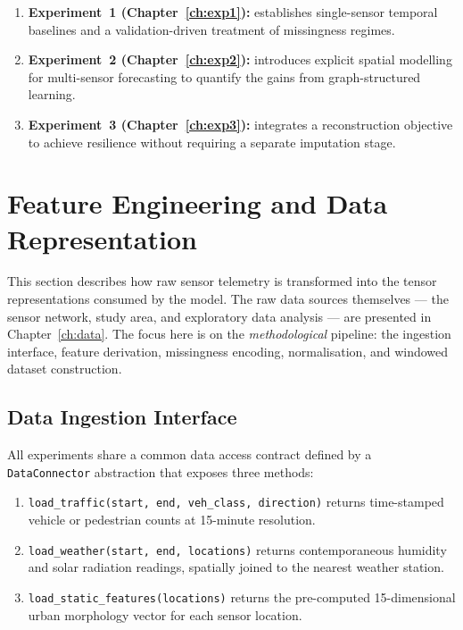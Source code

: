 \begin{enumerate}
    \item \textbf{Experiment~1 (Chapter~\ref{ch:exp1}):} establishes single-sensor temporal baselines and a validation-driven treatment of missingness regimes.
    \item \textbf{Experiment~2 (Chapter~\ref{ch:exp2}):} introduces explicit spatial modelling for multi-sensor forecasting to quantify the gains from graph-structured learning.
    \item \textbf{Experiment~3 (Chapter~\ref{ch:exp3}):} integrates a reconstruction objective to achieve resilience without requiring a separate imputation stage.
\end{enumerate}

\section{Feature Engineering and Data Representation}
\label{sec:meth-data}

This section describes how raw sensor telemetry is transformed into the tensor representations consumed by the model. The raw data sources themselves --- the sensor network, study area, and exploratory data analysis --- are presented in Chapter~\ref{ch:data}. The focus here is on the \emph{methodological} pipeline: the ingestion interface, feature derivation, missingness encoding, normalisation, and windowed dataset construction.

\subsection{Data Ingestion Interface}
\label{subsec:meth-ingestion}

All experiments share a common data access contract defined by a \texttt{DataConnector} abstraction that exposes three methods:

\begin{enumerate}
    \item \texttt{load\_traffic(start, end, veh\_class, direction)} returns time-stamped vehicle or pedestrian counts at 15-minute resolution.
    \item \texttt{load\_weather(start, end, locations)} returns contemporaneous humidity and solar radiation readings, spatially joined to the nearest weather station.
    \item \texttt{load\_static\_features(locations)} returns the pre-computed 15-dimensional urban morphology vector for each sensor location.
\end{enumerate}

